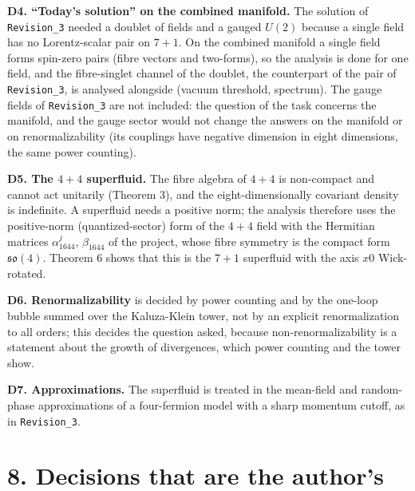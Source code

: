 \documentclass[
  10pt,
]{article}
\begin{document}
\textbf{D4. ``Today's solution'' on the combined manifold.} The solution
of \texttt{Revision\_3} needed a doublet of fields and a gauged \(U(2)\)
because a single field has no Lorentz-scalar pair on \(7+1\). On the
combined manifold a single field forms spin-zero pairs (fibre vectors
and two-forms), so the analysis is done for one field, and the
fibre-singlet channel of the doublet, the counterpart of the pair of
\texttt{Revision\_3}, is analysed alongside (vacuum threshold,
spectrum). The gauge fields of \texttt{Revision\_3} are not included:
the question of the task concerns the manifold, and the gauge sector
would not change the answers on the manifold or on renormalizability
(its couplings have negative dimension in eight dimensions, the same
power counting).

\textbf{D5. The \(4+4\) superfluid.} The fibre algebra of \(4+4\) is
non-compact and cannot act unitarily (Theorem 3), and the
eight-dimensionally covariant density is indefinite. A superfluid needs
a positive norm; the analysis therefore uses the positive-norm
(quantized-sector) form of the \(4+4\) field with the Hermitian matrices
\(\alpha^j_{1644}\), \(\beta_{1644}\) of the project, whose fibre
symmetry is the compact form \(\mathfrak{so}(4)\). Theorem 6 shows that
this is the \(7+1\) superfluid with the axis \(x0\) Wick-rotated.

\textbf{D6. Renormalizability} is decided by power counting and by the
one-loop bubble summed over the Kaluza-Klein tower, not by an explicit
renormalization to all orders; this decides the question asked, because
non-renormalizability is a statement about the growth of divergences,
which power counting and the tower show.

\textbf{D7. Approximations.} The superfluid is treated in the mean-field
and random-phase approximations of a four-fermion model with a sharp
momentum cutoff, as in \texttt{Revision\_3}.

\hypertarget{decisions-that-are-the-authors}{%
\section{8. Decisions that are the
author's}\label{decisions-that-are-the-authors}}
\end{document}
